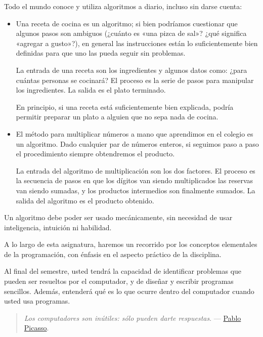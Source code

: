 Todo el mundo conoce y utiliza algoritmos a diario, incluso sin darse
cuenta:

\begin{itemize}
\item
  Una receta de cocina es un algoritmo; si bien podríamos cuestionar que
  algunos pasos son ambiguos (¿cuánto es «una pizca de sal»? ¿qué
  significa «agregar a gusto»?), en general las instrucciones están lo
  suficientemente bien definidas para que uno las pueda seguir sin
  problemas.

  La entrada de una receta son los ingredientes y algunos datos como:
  ¿para cuántas personas se cocinará? El proceso es la serie de pasos
  para manipular los ingredientes. La salida es el plato terminado.

  En principio, si una receta está suficientemente bien explicada,
  podría permitir preparar un plato a alguien que no sepa nada de
  cocina.
\end{itemize}

\begin{itemize}
\item
  El 
      método para multiplicar
  números a mano que aprendimos en el colegio es un
  algoritmo. Dado cualquier par de números enteros, si seguimos paso a
  paso el procedimiento siempre obtendremos el producto.


  La entrada del algoritmo de multiplicación son los dos factores. El
  proceso es la secuencia de pasos en que los dígitos van siendo
  multiplicados las reservas van siendo sumadas, y los productos
  intermedios son finalmente sumados. La salida del algoritmo es el
  producto obtenido.
\end{itemize}

Un algoritmo debe poder ser usado mecánicamente, sin necesidad de usar
inteligencia, intuición ni habilidad.

A lo largo de esta asignatura, haremos un recorrido por los conceptos
elementales de la programación, con énfasis en el aspecto práctico de la
disciplina.

Al final del semestre, usted tendrá la capacidad de identificar
problemas que pueden ser resueltos por el computador, y de diseñar y
escribir programas sencillos. Además, entenderá qué es lo que ocurre
dentro del computador cuando usted usa programas.

\begin{quote}
\emph{Los computadores son inútiles: sólo pueden darte respuestas}. ---
\href{http://es.wikipedia.org/wiki/Pablo_Picasso}{Pablo Picasso}.
\end{quote}
